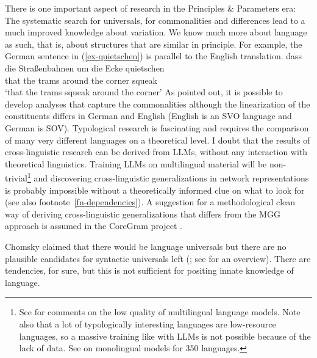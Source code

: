 There is one important aspect of research in the Principles \& Parameters era: The systematic search for
universals, for commonalities and differences lead to a much improved knowledge about variation. We
know much more about language as such, that is, about structures that are similar in principle.
For example, the German sentence in (\ref{ex-quietschen}) is parallel to the English translation. 
\ea
\label{ex-quietschen} 
\gll dass die Straßenbahnen um die Ecke quietschen\\
     that the trams         around the corner squeak\\
\glt `that the trams squeak around the corner'
\z
As \citet{MuellerUnifying} pointed out, it is possible to develop analyses that capture the
commonalities although the linearization of the constituents differs in German and English (English
is an SVO language and German is SOV). 
Typological research is fascinating and requires the comparison of many very different languages on a
theoretical level. I doubt that the results of cross-linguistic research can be derived from LLMs,
without any interaction with theoretical linguistics. Training LLMs on multilingual material will be
non-trivial\footnote{
  See \citet{ChangArnettTu2024a} for comments on the low quality of multilingual language
  models. Note also that a lot of typologically interesting languages are low-resource languages, so
  a massive training like with LLMs is not possible because of the lack of data. See
  \citet{ChangArnettTu2024a} on monolingual models for 350 languages.
} and discovering cross-linguistic generalizations in network representations is probably
impossible without a theoretically informed clue on what to look for (see also footnote~\ref{fn-dependencies}). A suggestion for a
methodological clean way of deriving cross-linguistic generalizations that differs from the MGG
approach is assumed in the CoreGram project \citep{MuellerCoreGram}.

Chomsky claimed that there would be language universals but there are no plausible candidates for
syntactic universals left (\citealt{EL2009a}; see \citealt[Section~13.1]{MuellerGT-Eng5} for an overview). There are tendencies, for sure, but this is not sufficient for positing
innate knowledge of language. 

